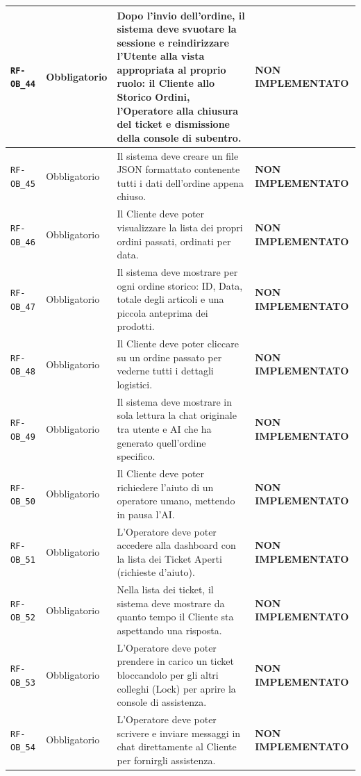 \documentclass[a4paper, 11pt, oneside]{scrartcl}
\begin{document}
\begin{longtable}{|>{\raggedright\arraybackslash}p{}|>{\raggedright\arraybackslash}p{}|>{\raggedright\arraybackslash}p{}|>{\raggedright\arraybackslash}p{}|}
    \hline
    \texttt{RF-OB\_44} & Obbligatorio & Dopo l'invio dell'ordine, il sistema deve svuotare la sessione e reindirizzare l'Utente alla vista appropriata al proprio ruolo: il Cliente allo Storico Ordini, l'Operatore alla chiusura del ticket e dismissione della console di subentro. & \textbf{NON IMPLEMENTATO} \\
    \hline
    \texttt{RF-OB\_45} & Obbligatorio & Il sistema deve creare un file JSON formattato contenente tutti i dati dell'ordine appena chiuso. & \textbf{NON IMPLEMENTATO} \\
    \hline
    \texttt{RF-OB\_46} & Obbligatorio & Il Cliente deve poter visualizzare la lista dei propri ordini passati, ordinati per data. & \textbf{NON IMPLEMENTATO} \\
    \hline
    \texttt{RF-OB\_47} & Obbligatorio & Il sistema deve mostrare per ogni ordine storico: ID, Data, totale degli articoli e una piccola anteprima dei prodotti. & \textbf{NON IMPLEMENTATO} \\
    \hline
    \texttt{RF-OB\_48} & Obbligatorio & Il Cliente deve poter cliccare su un ordine passato per vederne tutti i dettagli logistici. & \textbf{NON IMPLEMENTATO} \\
    \hline
    \texttt{RF-OB\_49} & Obbligatorio & Il sistema deve mostrare in sola lettura la chat originale tra utente e AI che ha generato quell'ordine specifico. & \textbf{NON IMPLEMENTATO} \\
    \hline
    \texttt{RF-OB\_50} & Obbligatorio & Il Cliente deve poter richiedere l'aiuto di un operatore umano, mettendo in pausa l'AI. & \textbf{NON IMPLEMENTATO} \\
    \hline
    \texttt{RF-OB\_51} & Obbligatorio & L'Operatore deve poter accedere alla dashboard con la lista dei Ticket Aperti (richieste d'aiuto). & \textbf{NON IMPLEMENTATO} \\
    \hline
    \texttt{RF-OB\_52} & Obbligatorio & Nella lista dei ticket, il sistema deve mostrare da quanto tempo il Cliente sta aspettando una risposta. & \textbf{NON IMPLEMENTATO} \\
    \hline
    \texttt{RF-OB\_53} & Obbligatorio & L'Operatore deve poter prendere in carico un ticket bloccandolo per gli altri colleghi (Lock) per aprire la console di assistenza. & \textbf{NON IMPLEMENTATO} \\
    \hline
    \texttt{RF-OB\_54} & Obbligatorio & L'Operatore deve poter scrivere e inviare messaggi in chat direttamente al Cliente per fornirgli assistenza. & \textbf{NON IMPLEMENTATO} \\

\end{longtable}
\end{document}
